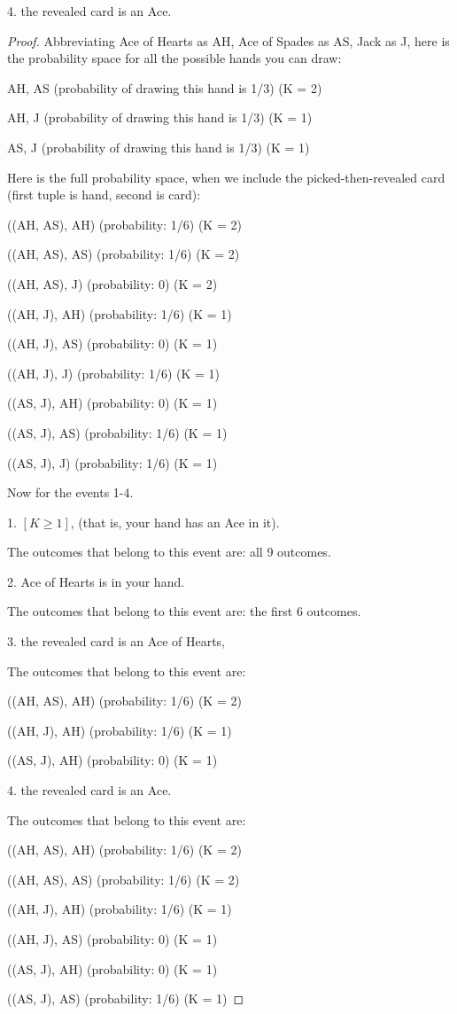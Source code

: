 \documentclass[14pt]{extarticle}
\begin{document}
4. the revealed card is an Ace.
\begin{proof}
Abbreviating Ace of Hearts as AH, Ace of Spades as AS, Jack as J, here is the probability space for all the possible hands you can draw:

AH, AS (probability of drawing this hand is 1/3) (K = 2)

AH, J (probability of drawing this hand is 1/3) (K = 1)

AS, J (probability of drawing this hand is 1/3) (K = 1)

Here is the full probability space, when we include the picked-then-revealed card (first tuple is hand, second is card):

((AH, AS), AH) (probability: 1/6) (K = 2)

((AH, AS), AS) (probability: 1/6) (K = 2)

((AH, AS), J) (probability: 0) (K = 2)

((AH, J), AH) (probability: 1/6) (K = 1)

((AH, J), AS) (probability: 0) (K = 1)

((AH, J), J) (probability: 1/6) (K = 1)

((AS, J), AH) (probability: 0) (K = 1)

((AS, J), AS) (probability: 1/6) (K = 1)

((AS, J), J) (probability: 1/6) (K = 1)

Now for the events 1-4.

1. $[K \geq 1]$, (that is, your hand has an Ace in it).

The outcomes that belong to this event are: all 9 outcomes.

2. Ace of Hearts is in your hand.

The outcomes that belong to this event are: the first 6 outcomes.

3. the revealed card is an Ace of Hearts,

The outcomes that belong to this event are:

((AH, AS), AH) (probability: 1/6) (K = 2)

((AH, J), AH) (probability: 1/6) (K = 1)

((AS, J), AH) (probability: 0) (K = 1)

4. the revealed card is an Ace.

The outcomes that belong to this event are:

((AH, AS), AH) (probability: 1/6) (K = 2)

((AH, AS), AS) (probability: 1/6) (K = 2)

((AH, J), AH) (probability: 1/6) (K = 1)

((AH, J), AS) (probability: 0) (K = 1)

((AS, J), AH) (probability: 0) (K = 1)

((AS, J), AS) (probability: 1/6) (K = 1)
\end{proof}
\end{document}
